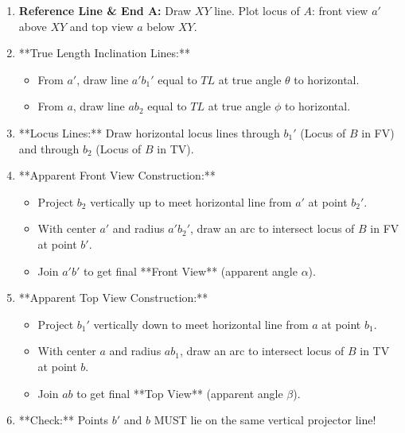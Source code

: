 \begin{enumerate}
    \item \textbf{Reference Line \& End A:} Draw $XY$ line. Plot locus of $A$: front view $a'$ above $XY$ and top view $a$ below $XY$.
    \item **True Length Inclination Lines:**
    \begin{itemize}
        \item From $a'$, draw line $a'b_1'$ equal to $TL$ at true angle $\theta$ to horizontal.
        \item From $a$, draw line $ab_2$ equal to $TL$ at true angle $\phi$ to horizontal.
    \end{itemize}
    \item **Locus Lines:** Draw horizontal locus lines through $b_1'$ (Locus of $B$ in FV) and through $b_2$ (Locus of $B$ in TV).
    \item **Apparent Front View Construction:**
    \begin{itemize}
        \item Project $b_2$ vertically up to meet horizontal line from $a'$ at point $b_2'$.
        \item With center $a'$ and radius $a'b_2'$, draw an arc to intersect locus of $B$ in FV at point $b'$.
        \item Join $a'b'$ to get final **Front View** (apparent angle $\alpha$).
    \end{itemize}
    \item **Apparent Top View Construction:**
    \begin{itemize}
        \item Project $b_1'$ vertically down to meet horizontal line from $a$ at point $b_1$.
        \item With center $a$ and radius $ab_1$, draw an arc to intersect locus of $B$ in TV at point $b$.
        \item Join $ab$ to get final **Top View** (apparent angle $\beta$).
    \end{itemize}
    \item **Check:** Points $b'$ and $b$ MUST lie on the same vertical projector line!
\end{enumerate}

